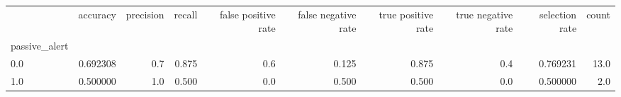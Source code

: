 \begin{tabular}{lrrrrrrrrr}
\toprule
{} &  accuracy &  precision &  recall &  false positive rate &  false negative rate &  true positive rate &  true negative rate &  selection rate &  count \\
passive\_alert &           &            &         &                      &                      &                     &                     &                 &        \\
\midrule
0.0           &  0.692308 &        0.7 &   0.875 &                  0.6 &                0.125 &               0.875 &                 0.4 &        0.769231 &   13.0 \\
1.0           &  0.500000 &        1.0 &   0.500 &                  0.0 &                0.500 &               0.500 &                 0.0 &        0.500000 &    2.0 \\
\bottomrule
\end{tabular}

